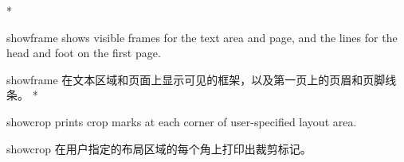 \begin{Options}
\begin{paracol}{2}
\switchcolumn[0]*\item[\onlypre showframe] shows visible frames for the text area and page,
  and the lines for the head and foot on the first page.
\switchcolumn\item[\onlypre showframe] 在文本区域和页面上显示可见的框架，以及第一页上的页眉和页脚线条。
\switchcolumn[0]*\item[\onlypre showcrop] prints crop marks at each corner of user-specified
layout area.
\switchcolumn\item[\onlypre showcrop] 在用户指定的布局区域的每个角上打印出裁剪标记。
\end{paracol}
\end{Options}
